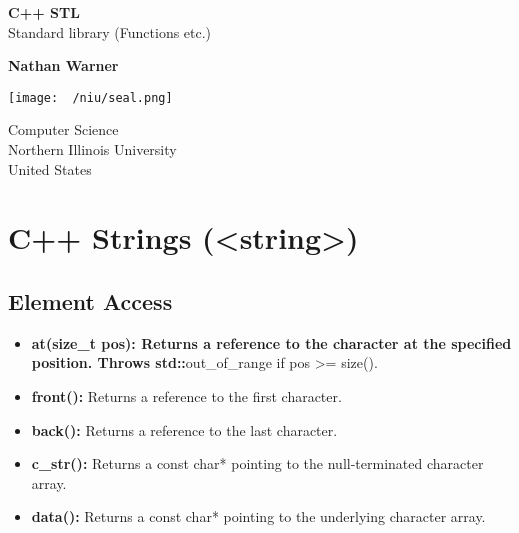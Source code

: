 \documentclass{report}
\title{\Huge{}}
\author{\huge{Nathan Warner}}
\date{\huge{}}
\begin{document}
        \begin{titlepage}
       \begin{center}
           \vspace*{1cm}
    
           \textbf{C++ STL} \\
           Standard library (Functions etc.)
    
           \vspace{0.5cm}
            
                
           \vspace{1.5cm}
    
           \textbf{Nathan Warner}
    
           \vfill
                
                
           \vspace{0.8cm}
         
           \texttt{[image: ~/niu/seal.png]}
                
           Computer Science \\
           Northern Illinois University\\
           United States\\
           
                
       \end{center}
    \end{titlepage}
    \tableofcontents
    \pagebreak \bigbreak \noindent
    \section{\LARGE C++ Strings (<string>)}
    \bigbreak \noindent 
    \subsection{Element Access}
    \begin{itemize}
        \item \textbf{at(size\_t \textbf{pos):} Returns a reference to the character at the specified position. Throws std::}out\_of\_range if pos >= size().
        \item \textbf{front():} Returns a reference to the first character.
        \item \textbf{back():} Returns a reference to the last character.
        \item \textbf{c\_str():} Returns a const char* pointing to the null-terminated character array.
        \item \textbf{data():} Returns a const char* pointing to the underlying character array.        
    \end{itemize}
    \bigbreak \noindent 
\end{document}
